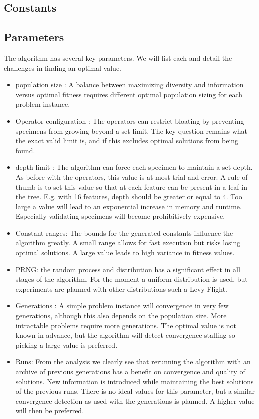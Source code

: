 \documentclass[10pt]{extarticle}
\begin{document}
\subsection{Constants}

\subsection{Parameters}
The algorithm has several key parameters. We will list each and detail the challenges in finding an optimal value.
\begin{itemize}
\item population size : A balance between maximizing diversity and information versus optimal fitness requires different optimal population sizing for each problem instance. 
\item Operator configuration : The operators can restrict bloating by preventing specimens from growing beyond a set limit. The key question remains what the exact valid limit is, and if this excludes optimal solutions from being found.
\item depth limit : The algorithm can force each specimen to maintain a set depth. As before with the operators, this value is at most trial and error. A rule of thumb is to set this value so that at each feature can be present in a leaf in the tree. E.g. with 16 features, depth should be greater or equal to 4. Too large a value will lead to an exponential increase in memory and runtime. Especially validating specimens will become prohibitively expensive.
\item Constant ranges: The bounds for the generated constants influence the algorithm greatly. A small range allows for fast execution but risks losing optimal solutions. A large value leads to high variance in fitness values. 
\item PRNG: the random process and distribution has a significant effect in all stages of the algorithm. For the moment a uniform distribution is used, but experiments are planned with other distributions such a Levy Flight.
\item Generations : A simple problem instance will convergence in very few generations, although this also depends on the population size. More intractable problems require more generations. The optimal value is not known in advance, but the algorithm will detect convergence stalling so picking a large value is preferred.
\item Runs: From the analysis we clearly see that rerunning the algorithm with an archive of previous generations has a benefit on convergence and quality of solutions. New information is introduced while maintaining the best solutions of the previous runs. There is no ideal values for this parameter, but a similar convergence detection as used with the generations is planned. A higher value will then be preferred.
\end{itemize}
\end{document}
